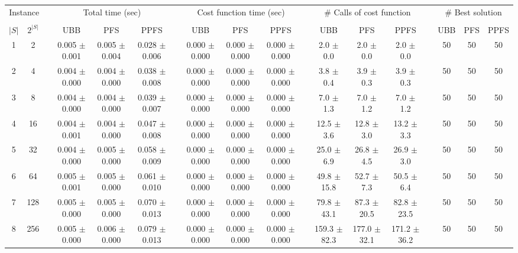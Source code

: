\documentclass[11pt]{article}
\begin{document}
\begin{landscape}
\begin{table}
\centering
\footnotesize
\begin{tabular}{cccccccccccccccccc}
\toprule
\multicolumn{2}{c}{Instance} & \phantom{} & \multicolumn{3}{c}{Total time (sec)}  & \phantom{} & \multicolumn{3}{c}{Cost function time (sec)}  & \phantom{} & \multicolumn{3}{c}{\# Calls of cost function}  & \phantom{} & \multicolumn{3}{c}{\# Best solution}\\
\cline{1-2}\cline{4-6}\cline{8-10}\cline{12-14}\cline{16-18}\\
$|S|$ & $2^{|S|}$ && UBB & PFS & PPFS && UBB & PFS & PPFS && UBB & PFS & PPFS && UBB & PFS & PPFS \\
 1 &       2 &&  0.005 $\pm$ 0.001 & 0.005 $\pm$ 0.004 & 0.028 $\pm$ 0.006 &&  0.000 $\pm$ 0.000 & 0.000 $\pm$ 0.000 & 0.000 $\pm$ 0.000 &&   2.0 $\pm$  0.0 &  2.0 $\pm$  0.0 &  2.0 $\pm$  0.0 && 50& 50& 50\\
 2 &       4 &&  0.004 $\pm$ 0.000 & 0.004 $\pm$ 0.000 & 0.038 $\pm$ 0.008 &&  0.000 $\pm$ 0.000 & 0.000 $\pm$ 0.000 & 0.000 $\pm$ 0.000 &&   3.8 $\pm$  0.4 &  3.9 $\pm$  0.3 &  3.9 $\pm$  0.3 && 50& 50& 50\\
 3 &       8 &&  0.004 $\pm$ 0.000 & 0.004 $\pm$ 0.000 & 0.039 $\pm$ 0.007 &&  0.000 $\pm$ 0.000 & 0.000 $\pm$ 0.000 & 0.000 $\pm$ 0.000 &&   7.0 $\pm$  1.3 &  7.0 $\pm$  1.2 &  7.0 $\pm$  1.2 && 50& 50& 50\\
 4 &      16 &&  0.004 $\pm$ 0.001 & 0.004 $\pm$ 0.000 & 0.047 $\pm$ 0.008 &&  0.000 $\pm$ 0.000 & 0.000 $\pm$ 0.000 & 0.000 $\pm$ 0.000 &&  12.5 $\pm$  3.6 & 12.8 $\pm$  3.0 & 13.2 $\pm$  3.3 && 50& 50& 50\\
 5 &      32 &&  0.004 $\pm$ 0.000 & 0.005 $\pm$ 0.000 & 0.058 $\pm$ 0.009 &&  0.000 $\pm$ 0.000 & 0.000 $\pm$ 0.000 & 0.000 $\pm$ 0.000 &&  25.0 $\pm$  6.9 & 26.8 $\pm$  4.5 & 26.9 $\pm$  3.0 && 50& 50& 50\\
 6 &      64 &&  0.005 $\pm$ 0.001 & 0.005 $\pm$ 0.000 & 0.061 $\pm$ 0.010 &&  0.000 $\pm$ 0.000 & 0.000 $\pm$ 0.000 & 0.000 $\pm$ 0.000 &&  49.8 $\pm$ 15.8 & 52.7 $\pm$  7.3 & 50.5 $\pm$  6.4 && 50& 50& 50\\
 7 &     128 &&  0.005 $\pm$ 0.000 & 0.005 $\pm$ 0.000 & 0.070 $\pm$ 0.013 &&  0.000 $\pm$ 0.000 & 0.000 $\pm$ 0.000 & 0.000 $\pm$ 0.000 &&  79.8 $\pm$ 43.1 & 87.3 $\pm$ 20.5 & 82.8 $\pm$ 23.5 && 50& 50& 50\\
 8 &     256 &&  0.005 $\pm$ 0.000 & 0.006 $\pm$ 0.000 & 0.079 $\pm$ 0.013 &&  0.000 $\pm$ 0.000 & 0.000 $\pm$ 0.000 & 0.000 $\pm$ 0.000 &&  159.3 $\pm$ 82.3 & 177.0 $\pm$ 32.1 & 171.2 $\pm$ 36.2 && 50& 50& 50\\

\end{tabular}
\end{table}
\end{landscape}
\end{document}
